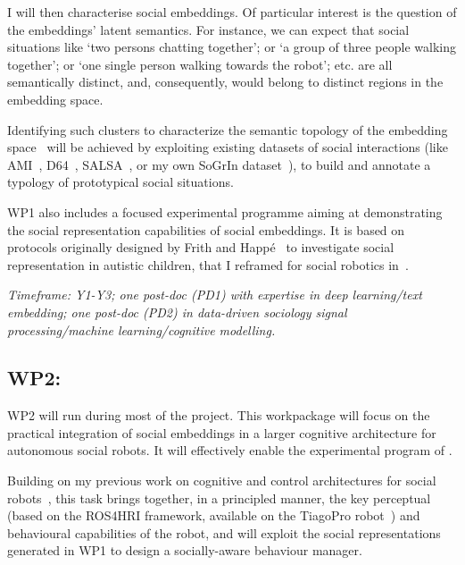 I will then characterise social embeddings. Of particular interest is the question of the embeddings' latent semantics. For
instance, we can expect that social situations like `two persons chatting
together'; or `a group of three people walking together'; or `one single person
walking towards the robot'; etc. are all semantically distinct, and,
consequently, would belong to distinct regions in the embedding space.

Identifying such clusters to characterize the semantic topology of the embedding
space~\cite{sun2023topological} will be achieved by exploiting existing datasets
of social interactions (like AMI~\cite{carletta2007ami},
D64~\cite{oertel2013d64}, SALSA~\cite{alameda2015salsa}, or my own SoGrIn
dataset~\cite{webb2023sogrin}), to build and annotate a typology of prototypical
social situations.

WP1 also includes a focused experimental programme aiming at demonstrating the
social representation capabilities of social embeddings. It is based on
protocols originally designed by Frith and Happé~\cite{frith1994autism} to
investigate social representation in autistic children, that I reframed for
social robotics in~\cite{lemaignan2015mutual}.

\vspace{1em}
\noindent\emph{ Timeframe: Y1-Y3; one post-doc (PD1) with expertise in
    deep learning/text embedding; one post-doc (PD2) in data-driven sociology
signal processing/machine learning/cognitive modelling.}

\subsection{WP2: \textbf{\wpTwo}}

WP2 will run during most of the project. This workpackage will focus on the
practical integration of social embeddings in a larger cognitive architecture
for autonomous social robots. It will effectively enable the experimental
program of \project.

Building on my previous work on cognitive and control architectures for social
robots~\cite{lemaignan2017artificial,lemaignan2015pyrobots,baxter2016cognitive,lemaignan2014challenges,lemaignan2011what},
this task brings together, in a principled manner, the key perceptual (based on
the ROS4HRI framework, available on the TiagoPro robot~\cite{ros2023ros4hri})
and behavioural capabilities of the robot, and will exploit the social
representations generated in WP1 to design a socially-aware behaviour manager.

